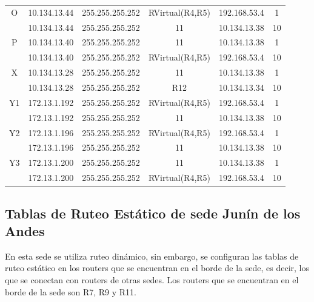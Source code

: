 \documentclass[12pt, a4paper, spanish]{article}
\begin{document}
\begin{center}
\begin{tabular}{|c|c|c|c|c|c|}
	\hline
	O & 10.134.13.44 & 255.255.255.252 & RVirtual(R4,R5) & 192.168.53.4 & 1\\
	 & 10.134.13.44 & 255.255.255.252 & 11 & 10.134.13.38 & 10\\
	\hline
	P & 10.134.13.40 & 255.255.255.252 & 11 & 10.134.13.38 & 1\\
	 & 10.134.13.40 & 255.255.255.252 & RVirtual(R4,R5) & 192.168.53.4 & 10\\
	\hline
	X & 10.134.13.28 & 255.255.255.252 & 11 & 10.134.13.38 & 1\\
	 & 10.134.13.28 & 255.255.255.252 & R12 & 10.134.13.34 & 10\\
	\hline
	Y1 & 172.13.1.192 & 255.255.255.252 & RVirtual(R4,R5) & 192.168.53.4 & 1\\
	 & 172.13.1.192 & 255.255.255.252 & 11 & 10.134.13.38 & 10\\
	\hline
	Y2 & 172.13.1.196 & 255.255.255.252 & RVirtual(R4,R5) & 192.168.53.4 & 1\\
	 & 172.13.1.196 & 255.255.255.252 & 11 & 10.134.13.38 & 10\\
	\hline
	Y3 & 172.13.1.200 & 255.255.255.252 & 11 & 10.134.13.38 & 1\\
	 & 172.13.1.200 & 255.255.255.252 & RVirtual(R4,R5) & 192.168.53.4 & 10\\
	\hline
\end{tabular}
\end{center}

\newpage
\subsection{Tablas de Ruteo Estático de sede Junín de los Andes}
En esta sede se utiliza ruteo dinámico, sin embargo, se configuran las tablas 
de ruteo estático en los routers que se encuentran en el borde de la sede, 
es decir, los que se conectan con routers de otras sedes.
Los routers que se encuentran en el borde de la sede son R7, R9 y R11.
\end{document}
